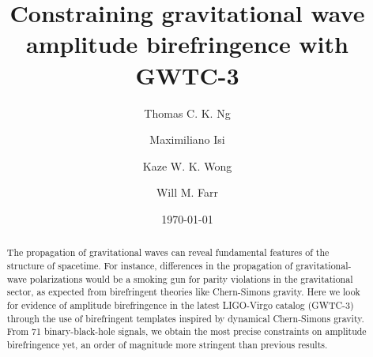 \documentclass[aps,prd,twocolumn,superscriptaddress,preprintnumbers,floatfix,nofootinbib]{revtex4-2}
\begin{document}
\title{Constraining gravitational wave amplitude birefringence with GWTC-3}

\author{Thomas C. K. Ng}

\author{Maximiliano Isi}

\author{Kaze W. K. Wong}

\author{Will M. Farr}

\date{\today}

\begin{abstract}
    The propagation of gravitational waves can reveal fundamental features of the structure of spacetime.
    For instance, differences in the propagation of gravitational-wave polarizations would be a smoking gun for parity violations in the gravitational sector, as expected from birefringent theories like Chern-Simons gravity.
    Here we look for evidence of amplitude birefringence in the latest LIGO-Virgo catalog (GWTC-3) through the use of birefringent templates inspired by dynamical Chern-Simons gravity.
    From 71 binary-black-hole signals, we obtain the most precise constraints on amplitude birefringence yet, an order of magnitude more stringent than previous results.
\end{abstract}

\maketitle

\begin{acronym}
\end{acronym}
\end{document}
